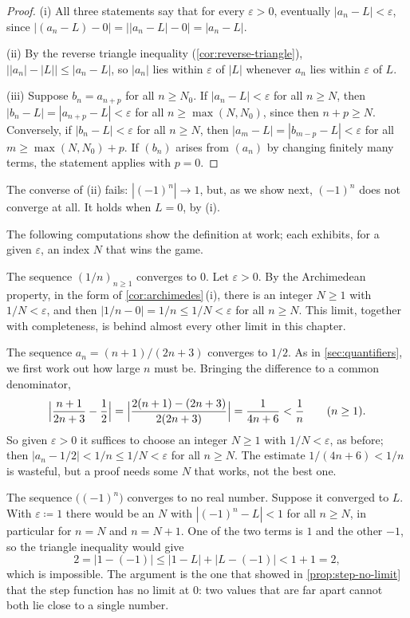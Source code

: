 \begin{proof}
(i) All three statements say that for every $\varepsilon>0$, eventually $|a_n-L|<\varepsilon$, since $|(a_n-L)-0|=\bigl||a_n-L|-0\bigr|=|a_n-L|$.

(ii) By the reverse triangle inequality (\cref{cor:reverse-triangle}), $\bigl||a_n|-|L|\bigr|\le|a_n-L|$, so $|a_n|$ lies within $\varepsilon$ of $|L|$ whenever $a_n$ lies within $\varepsilon$ of $L$.

(iii) Suppose $b_n=a_{n+p}$ for all $n\ge N_0$. If $|a_n-L|<\varepsilon$ for all $n\ge N$, then $|b_n-L|=|a_{n+p}-L|<\varepsilon$ for all $n\ge\max(N,N_0)$, since then $n+p\ge N$. Conversely, if $|b_n-L|<\varepsilon$ for all $n\ge N$, then $|a_m-L|=|b_{m-p}-L|<\varepsilon$ for all $m\ge\max(N,N_0)+p$. If $(b_n)$ arises from $(a_n)$ by changing finitely many terms, the statement applies with $p=0$.
\end{proof}

The converse of (ii) fails: $|(-1)^n|\to1$, but, as we show next, $(-1)^n$ does not converge at all. It holds when $L=0$, by (i).

The following computations show the definition at work; each exhibits, for a given $\varepsilon$, an index $N$ that wins the game.

The sequence $(1/n)_{n\ge1}$ converges to $0$. Let $\varepsilon>0$. By the Archimedean property, in the form of \cref{cor:archimedes}\,(i), there is an integer $N\ge1$ with $1/N<\varepsilon$, and then $|1/n-0|=1/n\le1/N<\varepsilon$ for all $n\ge N$. This limit, together with completeness, is behind almost every other limit in this chapter.

The sequence $a_n=(n+1)/(2n+3)$ converges to $1/2$. As in \cref{sec:quantifiers}, we first work out how large $n$ must be. Bringing the difference to a common denominator,
\[
\Bigl|\frac{n+1}{2n+3}-\frac12\Bigr|=\Bigl|\frac{2(n+1)-(2n+3)}{2(2n+3)}\Bigr|=\frac1{4n+6}<\frac1n\qquad(n\ge1).
\]
So given $\varepsilon>0$ it suffices to choose an integer $N\ge1$ with $1/N<\varepsilon$, as before; then $|a_n-1/2|<1/n\le1/N<\varepsilon$ for all $n\ge N$. The estimate $1/(4n+6)<1/n$ is wasteful, but a proof needs some $N$ that works, not the best one.

The sequence $\bigl((-1)^n\bigr)$ converges to no real number. Suppose it converged to $L$. With $\varepsilon\coloneqq1$ there would be an $N$ with $|(-1)^n-L|<1$ for all $n\ge N$, in particular for $n=N$ and $n=N+1$. One of the two terms is $1$ and the other $-1$, so the triangle inequality would give
\[
2=|1-(-1)|\le|1-L|+|L-(-1)|<1+1=2,
\]
which is impossible. The argument is the one that showed in \cref{prop:step-no-limit} that the step function has no limit at $0$: two values that are far apart cannot both lie close to a single number.

